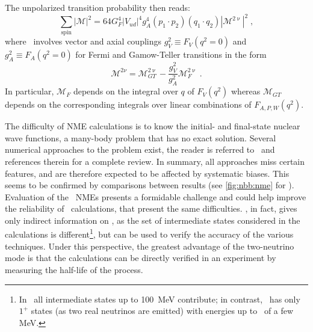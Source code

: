 The unpolarized transition probability
then reads:
\begin{equation}\label{eq:nbb:trans-prob}
  \sum_\text{spin} |\mathcal{M}|^2 = 64 G^4_F |V_{ud}|^4 g^4_A (p_1 \cdot p_2)
                                     (q_1 \cdot q_2) |\mathcal{M}^{2\upnu}|^2 \;,
\end{equation}
where \nmet\ involves vector and axial couplings $g^2_V
\equiv F_V(q^2=0)$ and $g^2_A \equiv F_A(q^2=0)$ for Fermi and Gamow-Teller
transitions in the form
\[
  \mathcal{M}^{2\nu} = \mathcal{M}^{2\upnu}_{GT} -
                       \frac{g^2_V}{g^2_A} \mathcal{M}^{2\upnu}_F \;.
\]
In particular, $\mathcal{M}_F$ depends on the integral over $q$ of $F_V(q^2)$
whereas $\mathcal{M}_{GT}$ depends on the corresponding integrals over linear
combinations of $F_{A,P,W}(q^2)$.

The difficulty of NME calculations is to know the initial- and final-state
nuclear wave functions, a many-body problem that has no exact solution. Several
numerical approaches to the problem exist, the reader is referred
to~\cite{Engel2017} and references therein for a complete review. In summary,
all approaches miss certain features, and are therefore expected to be affected
by systematic biases. This seems to be confirmed by comparisons between results
(see \cref{fig:nbb:nme} for \onbb). Evaluation of the \nnbb\ NMEs presents a
formidable challenge and could help improve the reliability of \nmez\
calculations, that present the same difficulties. \nnbb, in fact, gives only
indirect information on \onbb, as the set of intermediate states considered in
the calculations is different\footnote{In \onbb\ all intermediate states up
to 100~MeV contribute; in contrast, \nnbb\ has only $1^+$ states (as two real
neutrinos are emitted) with energies up to \qbb\ of a few MeV.}, but can be
used to verify the accuracy of the various techniques.  Under this perspective,
the greatest advantage of the two-neutrino mode is that the calculations can be
directly verified in an experiment by measuring the half-life of the process.

